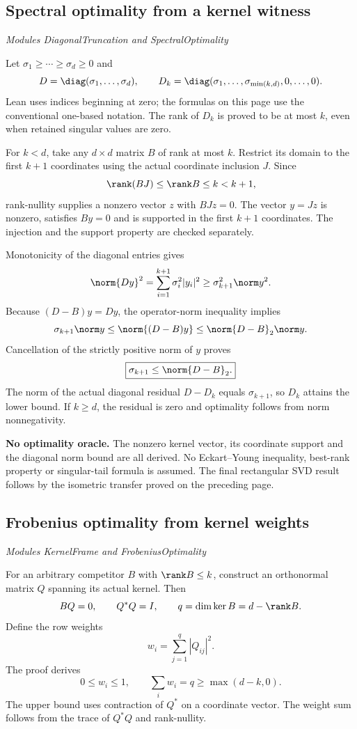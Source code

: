 \subsection{Spectral optimality from a kernel witness}\label{supp6:subsection:003}\textit{Modules DiagonalTruncation and SpectralOptimality}\par
Let $\sigma_1\geq\cdots\geq\sigma_d\geq0$ and
\[
D=\diag(\sigma_1,\ldots,\sigma_d),\qquad
D_k=\diag(\sigma_1,\ldots,\sigma_{\min(k,d)},0,\ldots,0).
\]
Lean uses indices beginning at zero; the formulas on this page use the conventional one-based notation. The rank of $D_k$ is proved to be at most $k$, even when retained singular values are zero.

For $k<d$, take any $d\times d$ matrix $B$ of rank at most $k$. Restrict its domain to the first $k+1$ coordinates using the actual coordinate inclusion $J$. Since
\[
\rank(BJ)\leq\rank B\leq k<k+1,
\]
rank-nullity supplies a nonzero vector $z$ with $BJz=0$. The vector $y=Jz$ is nonzero, satisfies $By=0$ and is supported in the first $k+1$ coordinates. The injection and the support property are checked separately.

Monotonicity of the diagonal entries gives
\[
\norm{Dy}^{2}
=\sum_{i=1}^{k+1}\sigma_i^{2}|y_i|^{2}
\geq\sigma_{k+1}^{2}\norm y^{2}.
\]
Because $(D-B)y=Dy$, the operator-norm inequality implies
\[
\sigma_{k+1}\norm y
\leq\norm{(D-B)y}
\leq\norm{D-B}_2\norm y.
\]
Cancellation of the strictly positive norm of $y$ proves
\[
\boxed{\sigma_{k+1}\leq\norm{D-B}_2.}
\]
The norm of the actual diagonal residual $D-D_k$ equals $\sigma_{k+1}$, so $D_k$ attains the lower bound. If $k\geq d$, the residual is zero and optimality follows from norm nonnegativity.

\textbf{No optimality oracle.} The nonzero kernel vector, its coordinate support and the diagonal norm bound are all derived. No Eckart--Young inequality, best-rank property or singular-tail formula is assumed. The final rectangular SVD result follows by the isometric transfer proved on the preceding page.



\subsection{Frobenius optimality from kernel weights}\label{supp6:subsection:004}\textit{Modules KernelFrame and FrobeniusOptimality}\par
For an arbitrary competitor $B$ with $\rank B\leq k$, construct an orthonormal matrix $Q$ spanning its actual kernel. Then
\[
BQ=0,\qquad Q^*Q=I,\qquad q=\dim\ker B=d-\rank B.
\]
Define the row weights
\[
w_i=\sum_{j=1}^{q}|Q_{ij}|^2.
\]
The proof derives
\[
\boxed{0\leq w_i\leq1,\qquad \sum_iw_i=q\geq\max(d-k,0).}
\]
The upper bound uses contraction of $Q^*$ on a coordinate vector. The weight sum follows from the trace of $Q^*Q$ and rank-nullity.

